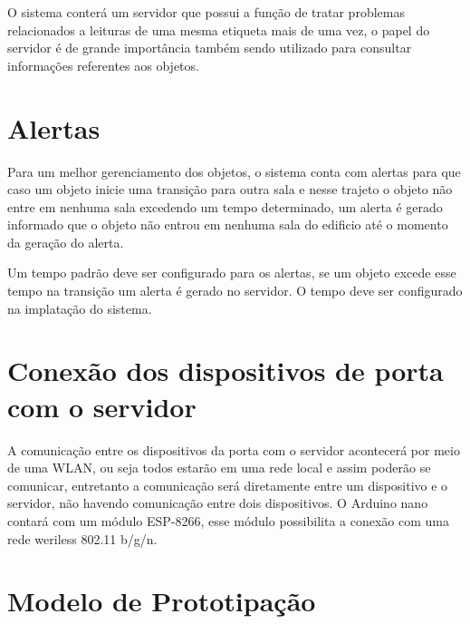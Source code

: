 \par
O sistema conterá um servidor 
que possui a função de tratar problemas relacionados a leituras de uma mesma etiqueta mais de uma vez, 
o papel do servidor é de grande importância também sendo utilizado para consultar informações referentes aos objetos.


\section{Alertas}

Para um melhor gerenciamento dos objetos, o sistema conta com alertas para que caso um objeto inicie uma transição 
para outra sala e nesse trajeto o objeto não entre em nenhuma sala excedendo um tempo determinado, um alerta é gerado 
informado que o objeto não entrou em nenhuma sala do edificio até o momento da geração do alerta.

\par
Um tempo padrão deve ser configurado para os alertas, se um objeto excede esse tempo na transição um alerta é gerado no servidor. 
O tempo deve ser configurado na implatação do sistema.



\section{Conexão dos dispositivos de porta com o servidor}
A comunicação entre os dispositivos da porta com o servidor acontecerá por meio de uma WLAN, ou seja todos estarão em uma rede 
local e assim poderão se comunicar, entretanto a comunicação será diretamente entre um dispositivo e o servidor, 
não havendo comunicação entre dois dispositivos. O Arduino nano contará com um módulo ESP-8266, esse módulo possibilita a 
conexão com uma rede weriless 802.11 b/g/n.


\section{Modelo de Prototipação}

